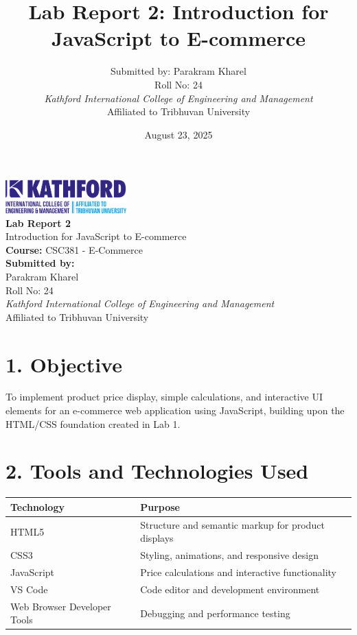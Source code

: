 \documentclass[a4paper,12pt]{article}
\title{Lab Report 2: Introduction for JavaScript to E-commerce}
\author{Submitted by: Parakram Kharel \\ Roll No: 24 \\ 
\textit{Kathford International College of Engineering and Management} \\ 
Affiliated to Tribhuvan University}
\begin{document}

\begin{titlepage}
  \begin{center}
    \vspace*{2cm}
    \includegraphics[width=0.35\textwidth]{Kath.png} \\[2cm]

    {\Huge \bfseries Lab Report 2} \\[0.5cm]
    {\Large Introduction for JavaScript to E-commerce} \\[2cm]

    {\Large \textbf{Course:} CSC381 - E-Commerce} \\[1cm]
    {\Large \textbf{Submitted by:}} \\[0.3cm]
    {\large Parakram Kharel \\ Roll No: 24} \\[2cm]

    \textit{Kathford International College of Engineering and Management} \\
    Affiliated to Tribhuvan University \\[3cm]
    
    \date{August 23, 2025}
    {\normalsize \@date}
  \end{center}
\end{titlepage}

\pagestyle{main}
\setlength{\parskip}{1em}

\section*{1. Objective}
To implement product price display, simple calculations, and interactive UI elements for an e-commerce web application using JavaScript, building upon the HTML/CSS foundation created in Lab 1.


\section*{2. Tools and Technologies Used}
\begin{longtable}{ll}
\toprule
\textbf{Technology} & \textbf{Purpose} \\
\midrule
HTML5 & Structure and semantic markup for product displays \\
CSS3 & Styling, animations, and responsive design \\
JavaScript & Price calculations and interactive functionality \\
VS Code & Code editor and development environment \\
Web Browser Developer Tools & Debugging and performance testing \\
\bottomrule
\end{longtable}
\end{document}
